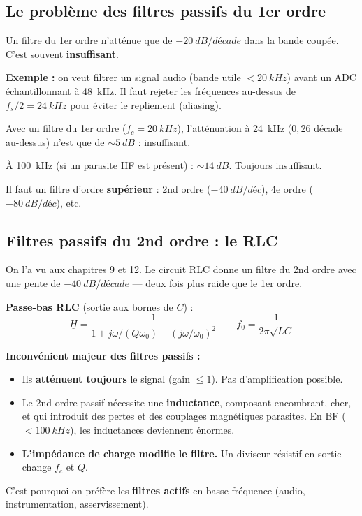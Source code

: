\documentclass[12pt,a4paper,twoside]{book}
\begin{document}
\subsection{Le problème des filtres passifs du 1er ordre}

Un filtre du 1er ordre n'atténue que de $-\SI{20}{dB/décade}$ dans la bande coupée. C'est souvent \textbf{insuffisant}.

\begin{pratique}
\textbf{Exemple :} on veut filtrer un signal audio (bande utile $< \SI{20}{kHz}$) avant un ADC échantillonnant à \SI{48}{kHz}. Il faut rejeter les fréquences au-dessus de $f_s/2 = \SI{24}{kHz}$ pour éviter le repliement (aliasing).

Avec un filtre du 1er ordre ($f_c = \SI{20}{kHz}$), l'atténuation à \SI{24}{kHz} ($0{,}26$ décade au-dessus) n'est que de $\sim\SI{5}{dB}$ : insuffisant.

À \SI{100}{kHz} (si un parasite HF est présent) : $\sim\SI{14}{dB}$. Toujours insuffisant.

Il faut un filtre d'ordre \textbf{supérieur} : 2nd ordre ($-\SI{40}{dB/déc}$), 4e ordre ($-\SI{80}{dB/déc}$), etc.
\end{pratique}

\subsection{Filtres passifs du 2nd ordre : le RLC}

On l'a vu aux chapitres 9 et 12. Le circuit RLC donne un filtre du 2nd ordre avec une pente de $-\SI{40}{dB/décade}$ --- deux fois plus raide que le 1er ordre.

\begin{formule}
\textbf{Passe-bas RLC} (sortie aux bornes de $C$) :
\[
\underline{H} = \frac{1}{1 + j\omega/(Q\omega_0) + (j\omega/\omega_0)^2} \qquad f_0 = \frac{1}{2\pi\sqrt{LC}}
\]
\end{formule}

\begin{attention}
\textbf{Inconvénient majeur des filtres passifs :}
\begin{itemize}[nosep]
\item Ils \textbf{atténuent toujours} le signal (gain $\leq 1$). Pas d'amplification possible.
\item Le 2nd ordre passif nécessite une \textbf{inductance}, composant encombrant, cher, et qui introduit des pertes et des couplages magnétiques parasites. En BF ($< \SI{100}{kHz}$), les inductances deviennent énormes.
\item \textbf{L'impédance de charge modifie le filtre.} Un diviseur résistif en sortie change $f_c$ et $Q$.
\end{itemize}
C'est pourquoi on préfère les \textbf{filtres actifs} en basse fréquence (audio, instrumentation, asservissement).
\end{attention}
\end{document}
